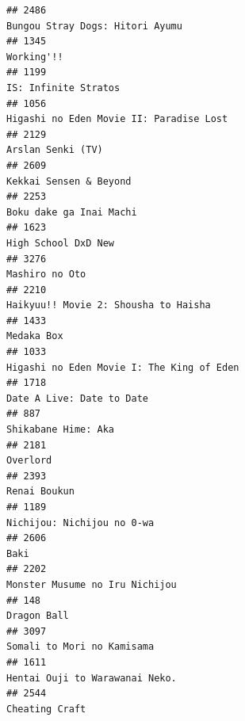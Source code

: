 \documentclass[
]{article}
\begin{document}
\begin{verbatim}
## 2486                                                                           Bungou Stray Dogs: Hitori Ayumu
## 1345                                                                                                Working'!!
## 1199                                                                                      IS: Infinite Stratos
## 1056                                                                   Higashi no Eden Movie II: Paradise Lost
## 2129                                                                                         Arslan Senki (TV)
## 2609                                                                                    Kekkai Sensen & Beyond
## 2253                                                                                   Boku dake ga Inai Machi
## 1623                                                                                       High School DxD New
## 3276                                                                                            Mashiro no Oto
## 2210                                                                      Haikyuu!! Movie 2: Shousha to Haisha
## 1433                                                                                                Medaka Box
## 1033                                                                 Higashi no Eden Movie I: The King of Eden
## 1718                                                                                 Date A Live: Date to Date
## 887                                                                                        Shikabane Hime: Aka
## 2181                                                                                                  Overlord
## 2393                                                                                              Renai Boukun
## 1189                                                                                Nichijou: Nichijou no 0-wa
## 2606                                                                                                      Baki
## 2202                                                                            Monster Musume no Iru Nichijou
## 148                                                                                                Dragon Ball
## 3097                                                                                Somali to Mori no Kamisama
## 1611                                                                            Hentai Ouji to Warawanai Neko.
## 2544                                                                                            Cheating Craft

\end{verbatim}
\end{document}
